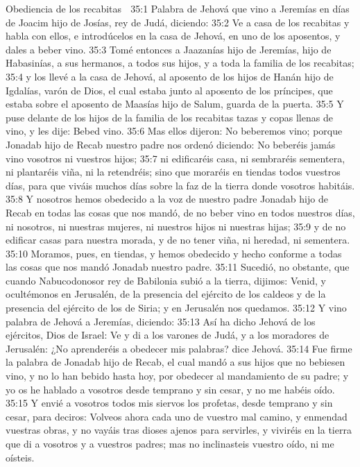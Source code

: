 Obediencia de los recabitas  

35:1 Palabra de Jehová que vino a Jeremías en días de Joacim hijo de Josías, rey de Judá, diciendo:  
35:2 Ve a casa de los recabitas y habla con ellos, e introdúcelos en la casa de Jehová, en uno de los aposentos, y dales a beber vino.  
35:3 Tomé entonces a Jaazanías hijo de Jeremías, hijo de Habasinías, a sus hermanos, a todos sus hijos, y a toda la familia de los recabitas;  
35:4 y los llevé a la casa de Jehová, al aposento de los hijos de Hanán hijo de Igdalías, varón de Dios, el cual estaba junto al aposento de los príncipes, que estaba sobre el aposento de Maasías hijo de Salum, guarda de la puerta.  
35:5 Y puse delante de los hijos de la familia de los recabitas tazas y copas llenas de vino, y les dije: Bebed vino.  
35:6 Mas ellos dijeron: No beberemos vino; porque Jonadab hijo de Recab nuestro padre nos ordenó diciendo: No beberéis jamás vino vosotros ni vuestros hijos;  
35:7 ni edificaréis casa, ni sembraréis sementera, ni plantaréis viña, ni la retendréis; sino que moraréis en tiendas todos vuestros días, para que viváis muchos días sobre la faz de la tierra donde vosotros habitáis.  
35:8 Y nosotros hemos obedecido a la voz de nuestro padre Jonadab hijo de Recab en todas las cosas que nos mandó, de no beber vino en todos nuestros días, ni nosotros, ni nuestras mujeres, ni nuestros hijos ni nuestras hijas;  
35:9 y de no edificar casas para nuestra morada, y de no tener viña, ni heredad, ni sementera.  
35:10 Moramos, pues, en tiendas, y hemos obedecido y hecho conforme a todas las cosas que nos mandó Jonadab nuestro padre.  
35:11 Sucedió, no obstante, que cuando Nabucodonosor rey de Babilonia subió a la tierra, dijimos: Venid, y ocultémonos en Jerusalén, de la presencia del ejército de los caldeos y de la presencia del ejército de los de Siria; y en Jerusalén nos quedamos.  
35:12 Y vino palabra de Jehová a Jeremías, diciendo:  
35:13 Así ha dicho Jehová de los ejércitos, Dios de Israel: Ve y di a los varones de Judá, y a los moradores de Jerusalén: ¿No aprenderéis a obedecer mis palabras? dice Jehová.  
35:14 Fue firme la palabra de Jonadab hijo de Recab, el cual mandó a sus hijos que no bebiesen vino, y no lo han bebido hasta hoy, por obedecer al mandamiento de su padre; y yo os he hablado a vosotros desde temprano y sin cesar, y no me habéis oído.  
35:15 Y envié a vosotros todos mis siervos los profetas, desde temprano y sin cesar, para deciros: Volveos ahora cada uno de vuestro mal camino, y enmendad vuestras obras, y no vayáis tras dioses ajenos para servirles, y viviréis en la tierra que di a vosotros y a vuestros padres; mas no inclinasteis vuestro oído, ni me oísteis.  
